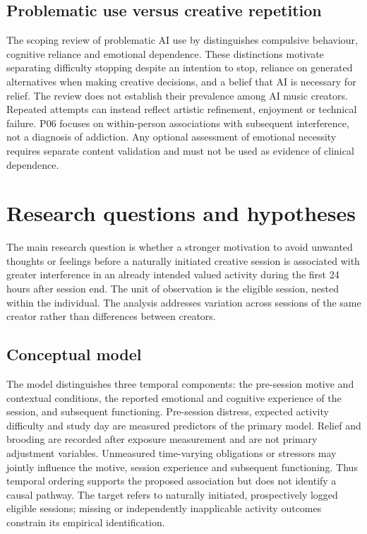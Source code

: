\documentclass[11pt]{article}
\begin{document}
\subsection{Problematic use versus creative repetition}
The scoping review of problematic AI use by \citet{dagnino2026} distinguishes compulsive behaviour, cognitive reliance and emotional dependence. These distinctions motivate separating difficulty stopping despite an intention to stop, reliance on generated alternatives when making creative decisions, and a belief that AI is necessary for relief. The review does not establish their prevalence among AI music creators. Repeated attempts can instead reflect artistic refinement, enjoyment or technical failure. P06 focuses on within-person associations with subsequent interference, not a diagnosis of addiction. Any optional assessment of emotional necessity requires separate content validation and must not be used as evidence of clinical dependence.

\section{Research questions and hypotheses}
The main research question is whether a stronger motivation to avoid unwanted thoughts or feelings before a naturally initiated creative session is associated with greater interference in an already intended valued activity during the first 24 hours after session end. The unit of observation is the eligible session, nested within the individual. The analysis addresses variation across sessions of the same creator rather than differences between creators.

\subsection{Conceptual model}
The model distinguishes three temporal components: the pre-session motive and contextual conditions, the reported emotional and cognitive experience of the session, and subsequent functioning. Pre-session distress, expected activity difficulty and study day are measured predictors of the primary model. Relief and brooding are recorded after exposure measurement and are not primary adjustment variables. Unmeasured time-varying obligations or stressors may jointly influence the motive, session experience and subsequent functioning. Thus temporal ordering supports the proposed association but does not identify a causal pathway. The target refers to naturally initiated, prospectively logged eligible sessions; missing or independently inapplicable activity outcomes constrain its empirical identification.
\end{document}
